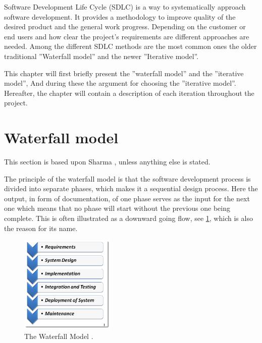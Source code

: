 
Software Development Life Cycle (SDLC) is a way to systematically approach software development.
It provides a methodology to improve quality of the desired product and the general work progress. 
Depending on the customer or end users and how clear the project's requirements are different approaches are needed. 
Among the different SDLC methods are the most common ones the older traditional ''Waterfall model'' and the newer ''Iterative model''. \cite{SDLC-Toolsqa}


This chapter will first briefly present the ''waterfall model'' and the ''iterative model'', And during these the argument for choosing the ''iterative model''.
Hereafter, the chapter will contain a description of each iteration throughout the project.


\section{Waterfall model}
This section is based upon Sharma \cite{Waterfall-Toolsqa}, unless anything else is stated.

The principle of the waterfall model is that the software development process is divided into separate phases, which makes it a sequential design process.
Here the output, in form of documentation, of one phase serves as the input for the next one which means that no phase will start without the previous one being complete.
This is often illustrated as a downward going flow, see \cref{fig:Waterfall}, which is also the reason for its name.

\begin{figure}[H]
	\centering
	\includegraphics[width=0.4\textwidth]{billeder/WaterFall-Model.png}
	\caption{The Waterfall Model \cite{Waterfall-Toolsqa}.}\label{fig:Waterfall}
\end{figure}

